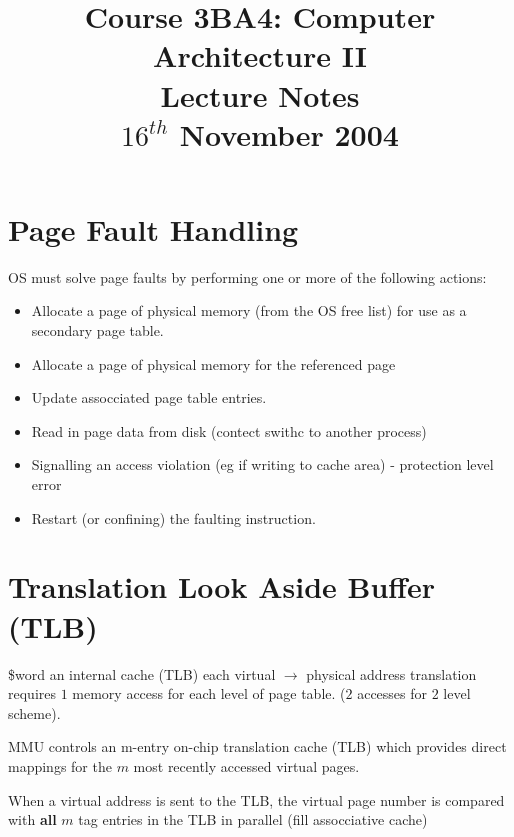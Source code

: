 \documentclass[a4paper,12pt]{article}
\begin{document}
\title{Course 3BA4: Computer Architecture II \\ Lecture Notes \\ $16^{th}$ November 2004}

\maketitle

\section*{Page Fault Handling}

OS must solve page faults by performing one or more of the following
actions:

\begin{itemize}

\item Allocate a page of physical memory (from the OS free list) for use
as a secondary page table.

\item Allocate a page of physical memory for the referenced page

\item Update assocciated page table entries.

\item Read in page data from disk (contect swithc to another process)

\item Signalling an access violation (eg if writing to cache area) -
protection level error

\item Restart (or confining) the faulting instruction.

\end{itemize}

\section*{Translation Look Aside Buffer (TLB)}

\$word an internal cache (TLB) each virtual $\to$ physical address
translation requires $1$ memory access for each level of page table. 
($2$ accesses for $2$ level scheme).

MMU controls an m-entry on-chip translation cache (TLB) which provides
direct mappings for the $m$ most recently accessed virtual pages.

When a virtual address is sent to the TLB, the virtual page number is
compared with \textbf{all} $m$ tag entries in the TLB in parallel (fill
assocciative cache)
\end{document}
